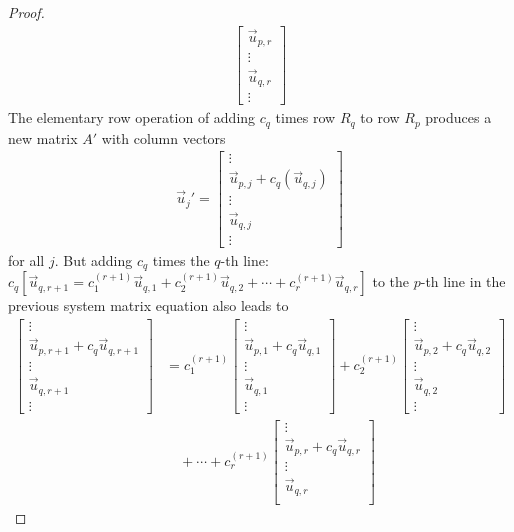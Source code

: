 \begin{proof}
{\begin{align*}
\begin{bmatrix}
\vec{u}_{p, r} \\
\vdots \\
\vec{u}_{q, r} \\
\vdots
\end{bmatrix}
\end{align*}
The elementary row operation of adding $c_q$ times row $R_q$ to row $R_p$ produces a new matrix $A'$ with column vectors
\begin{align*}
\vec{u}_j'
=
\begin{bmatrix}
\vdots \\
\vec{u}_{p, j} + c_q(\vec{u}_{q,j}) \\
\vdots \\
\vec{u}_{q, j} \\
\vdots
\end{bmatrix}
\end{align*}
for all $j$. But adding $c_q$ times the $q$-th line: $c_q[\vec{u}_{q,r+1} = c_1^{(r+1)}\vec{u}_{q,1} + c_2^{(r+1)}\vec{u}_{q,2} + \cdots + c_r^{(r+1)}\vec{u}_{q,r}]$ to the $p$-th line in the previous system matrix equation also leads to
\begin{align*}
\begin{bmatrix}
\vdots \\
\vec{u}_{p, r+1} + c_q\vec{u}_{q, r+1} \\
\vdots \\
\vec{u}_{q, r+1} \\
\vdots
\end{bmatrix}
&= c_1^{(r+1)}
\begin{bmatrix}
\vdots \\
\vec{u}_{p, 1} + c_q\vec{u}_{q, 1} \\
\vdots \\
\vec{u}_{q, 1} \\
\vdots
\end{bmatrix}
+
c_2^{(r+1)}
\begin{bmatrix}
\vdots \\
\vec{u}_{p, 2} + c_q\vec{u}_{q, 2} \\
\vdots \\
\vec{u}_{q, 2} \\
\vdots
\end{bmatrix} \\
&\quad + \cdots + 
c_r^{(r+1)}
\begin{bmatrix}
\vdots \\
\vec{u}_{p, r} + c_q\vec{u}_{q, r} \\
\vdots \\
\vec{u}_{q, r} \\

\end{bmatrix}
\end{align*}}
\end{proof}
